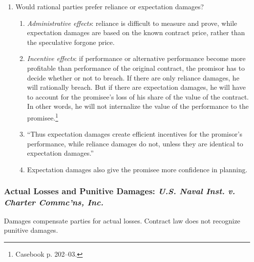 \begin{enumerate}
\begin{enumerate}
        contracting parties would have reached when bargaining under ideal 
        conditions.''\footnote{Casebook p. 202.}
        \item Would rational parties prefer reliance or expectation damages?
        \begin{enumerate}
            \item \emph{Administrative effects}: reliance is difficult to 
            measure and prove, while expectation damages are based on the 
            known contract price, rather than the speculative forgone price.
            \item \emph{Incentive effects}: if performance or alternative 
            performance become more profitable than performance of the 
            original contract, the promisor has to decide whether or not to 
            breach. If there are only reliance damages, he will rationally 
            breach. But if there are expectation damages, he will have to 
            account for the promisee's loss of his share of the value of the 
            contract. In other words, he will not internalize the value of the 
            performance to the promisee.\footnote{Casebook p. 202--03.}
            \item ``Thus expectation damages create efficient incentives for 
            the promisor's performance, while reliance damages do not, unless 
            they are identical to expectation damages.''
            \item Expectation damages also give the promisee more confidence 
            in planning.
        \end{enumerate}
    \end{enumerate}
\end{enumerate}

\subsubsection{Actual Losses and Punitive Damages: \emph{U.S. Naval Inst. v. 
Charter Commc'ns, Inc.}}

Damages compensate parties for actual losses. Contract law does not recognize 
punitive damages.

